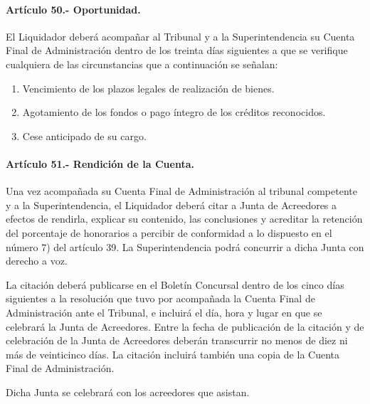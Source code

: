 \documentclass[
]{book}
\begin{document}
\hypertarget{artuxedculo-50.--oportunidad.}{%
\paragraph*{Artículo 50.- Oportunidad.}\label{artuxedculo-50.--oportunidad.}}

El Liquidador deberá acompañar al Tribunal y a la Superintendencia su Cuenta Final de Administración dentro de los treinta días siguientes a que se verifique cualquiera de las circunstancias que a continuación se señalan:

\begin{enumerate}
\def\labelenumi{\arabic{enumi})}
\item
  Vencimiento de los plazos legales de realización de bienes.
\item
  Agotamiento de los fondos o pago íntegro de los créditos reconocidos.
\item
  Cese anticipado de su cargo.
\end{enumerate}

\hypertarget{artuxedculo-51.--rendiciuxf3n-de-la-cuenta.}{%
\paragraph*{Artículo 51.- Rendición de la Cuenta.}\label{artuxedculo-51.--rendiciuxf3n-de-la-cuenta.}}

Una vez acompañada su Cuenta Final de Administración al tribunal competente y a la Superintendencia, el Liquidador deberá citar a Junta de Acreedores a efectos de rendirla, explicar su contenido, las conclusiones y acreditar la retención del porcentaje de honorarios a percibir de conformidad a lo dispuesto en el número 7) del artículo 39. La Superintendencia podrá concurrir a dicha Junta con derecho a voz.

La citación deberá publicarse en el Boletín Concursal dentro de los cinco días siguientes a la resolución que tuvo por acompañada la Cuenta Final de Administración ante el Tribunal, e incluirá el día, hora y lugar en que se celebrará la Junta de Acreedores. Entre la fecha de publicación de la citación y de celebración de la Junta de Acreedores deberán transcurrir no menos de diez ni más de veinticinco días. La citación incluirá también una copia de la Cuenta Final de Administración.

Dicha Junta se celebrará con los acreedores que asistan.
\end{document}
